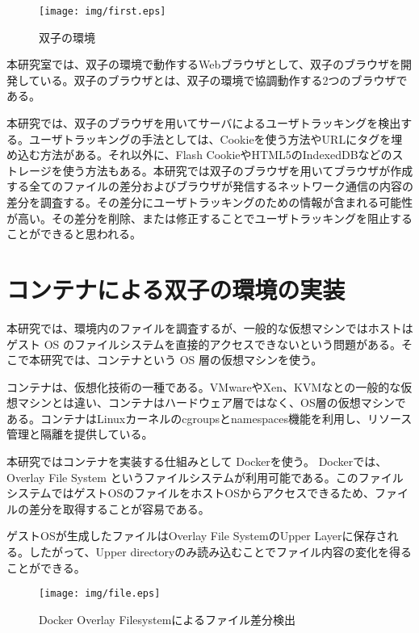 \documentclass[a4paper,twocolumn,10pt]{jarticle}
\begin{document}
\begin{figure}[t]
\begin{center}
\texttt{[image: img/first.eps]}
\vspace*{-10mm}\caption{双子の環境}
\label{figure:twin}
\end{center}
\end{figure}



本研究室では、双子の環境で動作するWebブラウザとして、双子のブラウザを開発している\cite{comsys}。双子のブラウザとは、双子の環境で協調動作する2つのブラウザである。

本研究では、双子のブラウザを用いてサーバによるユーザトラッキングを検出する。ユーザトラッキングの手法としては、Cookieを使う方法やURLにタグを埋め込む方法がある。それ以外に、Flash CookieやHTML5のIndexedDBなどのストレージを使う方法もある。本研究では双子のブラウザを用いてブラウザが作成する全てのファイルの差分およびブラウザが発信するネットワーク通信の内容の差分を調査する。その差分にユーザトラッキングのための情報が含まれる可能性が高い。その差分を削除、または修正することでユーザトラッキングを阻止することができると思われる。




\section{コンテナによる双子の環境の実装}
本研究では、環境内のファイルを調査するが、一般的な仮想マシンではホストはゲスト OS のファイルシステムを直接的アクセスできないという問題がある。そこで本研究では、コンテナという OS 層の仮想マシンを使う。

コンテナは、仮想化技術の一種である。VMwareやXen、KVMなとの一般的な仮想マシンとは違い、コンテナはハードウェア層ではなく、OS層の仮想マシンである。コンテナはLinuxカーネルのcgroupsとnamespaces機能を利用し、リソース管理と隔離を提供している。


本研究ではコンテナを実装する仕組みとして Dockerを使う。 Dockerでは、 Overlay File System というファイルシステムが利用可能である。このファイルシステムではゲストOSのファイルをホストOSからアクセスできるため、ファイルの差分を取得することが容易である。

ゲストOSが生成したファイルはOverlay File SystemのUpper Layerに保存される。したがって、Upper directoryのみ読み込むことでファイル内容の変化を得ることができる。




\begin{figure*}[ht]
\begin{center}
\texttt{[image: img/file.eps]}
\caption{Docker Overlay Filesystemによるファイル差分検出}
\label{figure:file}
\end{center}
\end{figure*}
\end{document}
